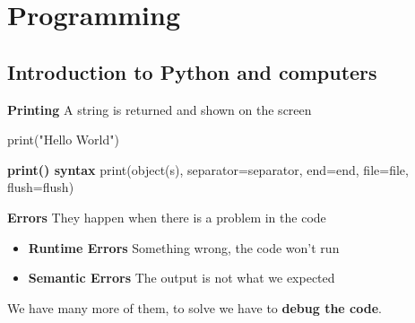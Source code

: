 \section{Programming}


\subsection{Introduction to Python and computers}

\textbf{Printing} \ra A string is returned and shown on the screen
\begin{pythoncode}
    print("Hello World")
\end{pythoncode}

\textbf{print() syntax} \ra print(object(s), separator=separator, end=end, file=file, flush=flush)

\vspace{20pt}

\textbf{Errors} \ra They happen when there is a problem in the code

\begin{itemize}
    \item \textbf{Runtime Errors} \ra Something wrong, the code won't run 
    \item \textbf{Semantic Errors} \ra The output is not what we expected
    
\end{itemize}

We have many more of them, to solve we have to \textbf{debug the code}.

\vspace{20pt}

